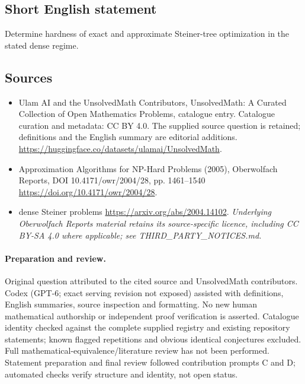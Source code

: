 \documentclass[11pt]{article}
\begin{document}
\subsection{Short English statement}
Determine hardness of exact and approximate Steiner-tree optimization in the stated dense regime.
\subsection{Sources}
\begin{itemize}
\item[\hypertarget{source:statement:1}{S1}] Ulam AI and the UnsolvedMath Contributors, UnsolvedMath: A Curated Collection of Open Mathematics Problems, catalogue entry. Catalogue curation and metadata: CC BY 4.0. The supplied source question is retained; definitions and the English summary are editorial additions.
\url{https://huggingface.co/datasets/ulamai/UnsolvedMath}.
\item[\hypertarget{source:statement:2}{S2}] Approximation Algorithms for NP-Hard Problems (2005), Oberwolfach Reports, DOI 10.4171/owr/2004/28, pp. 1461--1540
\url{https://doi.org/10.4171/owr/2004/28}.
\item[\hypertarget{source:statement:3}{S3}] dense Steiner problems
\url{https://arxiv.org/abs/2004.14102}.
\textit{Underlying Oberwolfach Reports material retains its source-specific licence, including CC BY-SA 4.0 where applicable; see THIRD\_PARTY\_NOTICES.md.}
\end{itemize}
\paragraph{Preparation and review.}
Original question attributed to the cited source and UnsolvedMath contributors. Codex (GPT-6; exact serving revision not exposed) assisted with definitions, English summaries, source inspection and formatting. No new human mathematical authorship or independent proof verification is asserted. Catalogue identity checked against the complete supplied registry and existing repository statements; known flagged repetitions and obvious identical conjectures excluded. Full mathematical-equivalence/literature review has not been performed. Statement preparation and final review followed contribution prompts C and D; automated checks verify structure and identity, not open status.
\label{end:statement}
\end{document}
